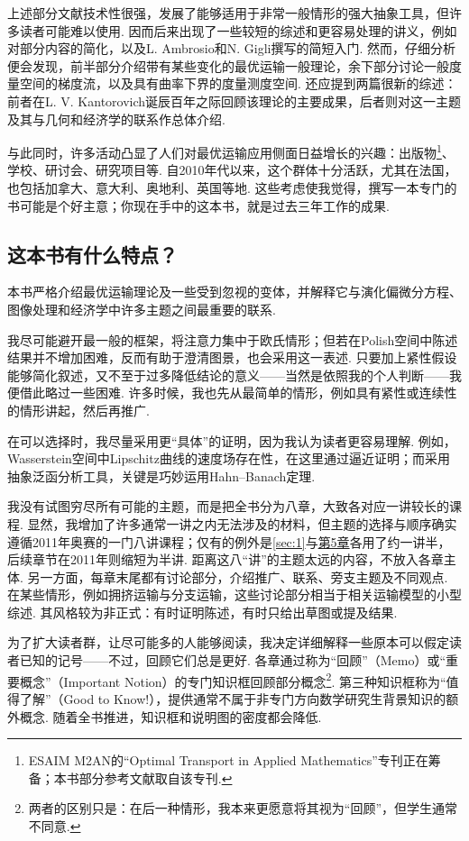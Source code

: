上述部分文献技术性很强，发展了能够适用于非常一般情形的强大抽象工具，但许多读者可能难以使用. 因而后来出现了一些较短的综述和更容易处理的讲义，例如\cite{b11}对\cite{b15}部分内容的简化，以及L. Ambrosio和N. Gigli撰写的简短入门\cite{b9}. 然而，仔细分析\cite{b9}便会发现，前半部分介绍带有某些变化的最优运输一般理论，余下部分讨论一般度量空间的梯度流，以及具有曲率下界的度量测度空间. 还应提到两篇很新的综述\cite{b63,b228}：前者在L. V. Kantorovich诞辰百年之际回顾该理论的主要成果，后者则对这一主题及其与几何和经济学的联系作总体介绍.

与此同时，许多活动凸显了人们对最优运输应用侧面日益增长的兴趣：出版物\footnote{ESAIM M2AN的“Optimal Transport in Applied Mathematics”专刊正在筹备；本书部分参考文献取自该专刊.}、学校、研讨会、研究项目等. 自2010年代以来，这个群体十分活跃，尤其在法国，也包括加拿大、意大利、奥地利、英国等地. 这些考虑使我觉得，撰写一本专门的书可能是个好主意；你现在手中的这本书，就是过去三年工作的成果.

\subsection*{这本书有什么特点？}
本书严格介绍最优运输理论及一些受到忽视的变体，并解释它与演化偏微分方程、图像处理和经济学中许多主题之间最重要的联系.

我尽可能避开最一般的框架，将注意力集中于欧氏情形；但若在Polish空间中陈述结果并不增加困难，反而有助于澄清图景，也会采用这一表述. 只要加上紧性假设能够简化叙述，又不至于过多降低结论的意义——当然是依照我的个人判断——我便借此略过一些困难. 许多时候，我也先从最简单的情形，例如具有紧性或连续性的情形讲起，然后再推广.

在可以选择时，我尽量采用更“具体”的证明，因为我认为读者更容易理解. 例如，Wasserstein空间中Lipschitz曲线的速度场存在性，在这里通过逼近证明；而\cite{b15}采用抽象泛函分析工具，关键是巧妙运用Hahn--Banach定理.

我没有试图穷尽所有可能的主题，而是把全书分为八章，大致各对应一讲较长的课程. 显然，我增加了许多通常一讲之内无法涉及的材料，但主题的选择与顺序确实遵循2011年奥赛的一门八讲课程；仅有的例外是\autoref{sec:1}与\hyperref[sec:5]{第5章}各用了约一讲半，后续章节在2011年则缩短为半讲. 距离这八“讲”的主题太远的内容，不放入各章主体. 另一方面，每章末尾都有讨论部分，介绍推广、联系、旁支主题及不同观点. 在某些情形，例如拥挤运输与分支运输，这些讨论部分相当于相关运输模型的小型综述. 其风格较为非正式：有时证明陈述，有时只给出草图或提及结果.

为了扩大读者群，让尽可能多的人能够阅读，我决定详细解释一些原本可以假定读者已知的记号——不过，回顾它们总是更好. 各章通过称为“回顾”（Memo）或“重要概念”（Important Notion）的专门知识框回顾部分概念\footnote{两者的区别只是：在后一种情形，我本来更愿意将其视为“回顾”，但学生通常不同意.}. 第三种知识框称为“值得了解”（Good to Know!），提供通常不属于非专门方向数学研究生背景知识的额外概念. 随着全书推进，知识框和说明图的密度都会降低.

